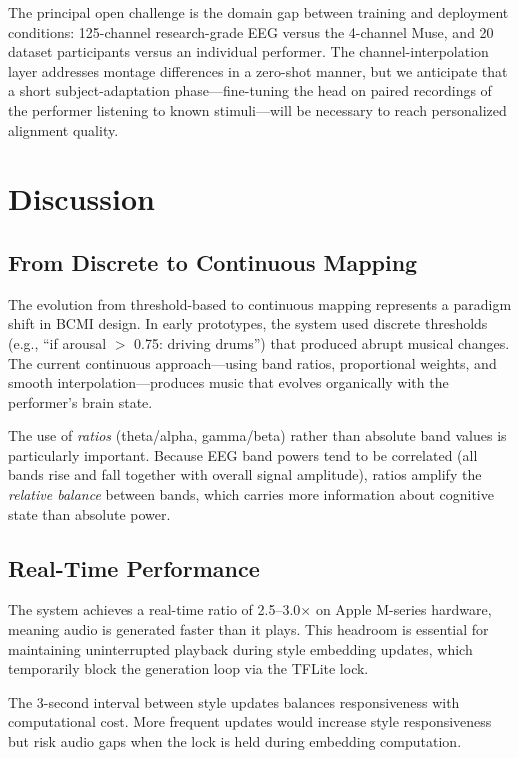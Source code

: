 \documentclass[manuscript,review,anonymous]{acmart}
\begin{document}
The principal open challenge is the domain gap between training and deployment conditions: 125-channel research-grade EEG versus the 4-channel Muse, and 20 dataset participants versus an individual performer. The channel-interpolation layer addresses montage differences in a zero-shot manner, but we anticipate that a short subject-adaptation phase---fine-tuning the head on paired recordings of the performer listening to known stimuli---will be necessary to reach personalized alignment quality.

\section{Discussion}

\subsection{From Discrete to Continuous Mapping}

The evolution from threshold-based to continuous mapping represents a paradigm shift in BCMI design. In early prototypes, the system used discrete thresholds (e.g., ``if arousal $>$ 0.75: driving drums'') that produced abrupt musical changes. The current continuous approach---using band ratios, proportional weights, and smooth interpolation---produces music that evolves organically with the performer's brain state.

The use of \emph{ratios} (theta/alpha, gamma/beta) rather than absolute band values is particularly important. Because EEG band powers tend to be correlated (all bands rise and fall together with overall signal amplitude), ratios amplify the \emph{relative balance} between bands, which carries more information about cognitive state than absolute power.

\subsection{Real-Time Performance}

The system achieves a real-time ratio of 2.5--3.0$\times$ on Apple M-series hardware, meaning audio is generated faster than it plays. This headroom is essential for maintaining uninterrupted playback during style embedding updates, which temporarily block the generation loop via the TFLite lock.

The 3-second interval between style updates balances responsiveness with computational cost. More frequent updates would increase style responsiveness but risk audio gaps when the lock is held during embedding computation.
\end{document}
